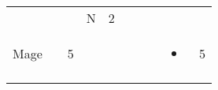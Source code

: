 \documentclass[12pt]{article}
\newcommand{\indexClass}[1]{\index{#1}}
\newcommand{\class}[1]{#1\indexClass{#1}}
\begin{document}
\begin{longtable}[]{@{}llllllllll@{}}
\begin{minipage}[t]{0.06\columnwidth}\raggedright\strut
\strut\end{minipage} &
\begin{minipage}[t]{0.06\columnwidth}\raggedright\strut
\strut\end{minipage} &
\begin{minipage}[t]{0.06\columnwidth}\raggedright\strut
\strut\end{minipage} &
\begin{minipage}[t]{0.07\columnwidth}\raggedright\strut
N
\strut\end{minipage} &
\begin{minipage}[t]{0.08\columnwidth}\raggedright\strut
2
\strut\end{minipage}\tabularnewline
\begin{minipage}[t]{0.13\columnwidth}\raggedright\strut
\class{Mage}
\strut\end{minipage} &
\begin{minipage}[t]{0.06\columnwidth}\raggedright\strut
\strut\end{minipage} &
\begin{minipage}[t]{0.06\columnwidth}\raggedright\strut
5
\strut\end{minipage} &
\begin{minipage}[t]{0.06\columnwidth}\raggedright\strut
\strut\end{minipage} &
\begin{minipage}[t]{0.06\columnwidth}\raggedright\strut
\strut\end{minipage} &
\begin{minipage}[t]{0.06\columnwidth}\raggedright\strut
\strut\end{minipage} &
\begin{minipage}[t]{0.06\columnwidth}\raggedright\strut
\strut\end{minipage} &
\begin{minipage}[t]{0.06\columnwidth}\raggedright\strut
\strut\end{minipage} &
\begin{minipage}[t]{0.07\columnwidth}\raggedright\strut
\begin{itemize}
\item
\end{itemize}
\strut\end{minipage} &
\begin{minipage}[t]{0.08\columnwidth}\raggedright\strut
5
\strut\end{minipage}\tabularnewline
\begin{minipage}[t]{0.13\columnwidth}\raggedright\strut

\end{minipage}
\end{longtable}
\end{document}

